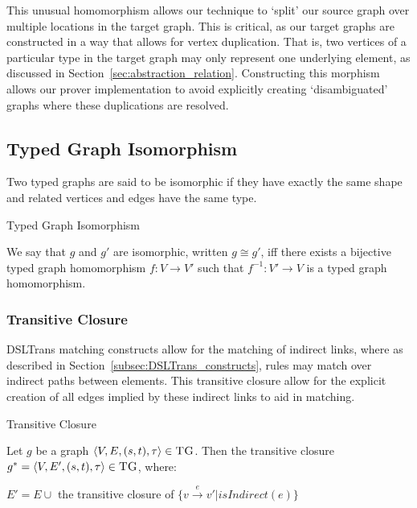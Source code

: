 This unusual homomorphism allows our technique to `split' our source graph over multiple locations in the target graph. This is critical, as our target graphs are constructed in a way that allows for vertex duplication. That is, two vertices of a particular type in the target graph may only represent one underlying element, as discussed in Section~\ref{sec:abstraction_relation}. Constructing this morphism allows our prover implementation to avoid explicitly creating `disambiguated' graphs where these duplications are resolved.


\subsection*{Typed Graph Isomorphism}
Two typed graphs are said to be isomorphic if they have exactly the same shape and related vertices and edges have the same type.


\begin{definition}{Typed Graph Isomorphism\\}
\label{def:typed_graph_isomorphism}

We say that $g$ and $g'$ are isomorphic, written $g\cong g'$, iff there exists a bijective typed graph homomorphism $f:V\rightarrow V'$ such that $f^{-1}:V'\rightarrow V$ is a typed graph homomorphism.
\end{definition}




\subsubsection*{Transitive Closure}

DSLTrans matching constructs allow for the matching of indirect links, where as described in Section~\ref{subsec:DSLTrans_constructs}, rules may match over indirect paths between elements. This transitive closure allow for the explicit creation of all edges implied by these indirect links to aid in matching.


\begin{definition}{Transitive Closure\\}
\label{def:instance_closure}

Let $g$ be a graph $\langle V,E,(s, t),\tau\rangle \in \textsc{TG}$. Then the transitive closure $g^{*} = \langle V,E',(s, t),\tau\rangle \in \textsc{TG}$, where:

$E' = E \cup $ the transitive closure of $\big\{v\xrightarrow{e}v' | \mathit{isIndirect(e)} \big\}$
\end{definition}


